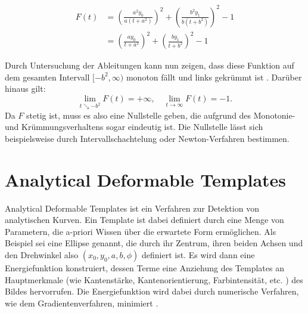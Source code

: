 \begin{enumerate}
\[
	\begin{aligned}
		F(t) &= \left(\frac{a^2y_0}{a\left(t+a^2\right)}\right)^2 + \left(\frac{b^2y_1}{b\left(t+b^2\right)}\right)^2 - 1 \\
		&= \left(\frac{ay_0}{t+a^2}\right)^2 + \left(\frac{by_1}{t+b^2}\right)^2 - 1
	\end{aligned}
\]

	Durch Untersuchung der Ableitungen kann nun zeigen, dass diese Funktion auf dem gesamten Intervall $[-b^2,\infty)$ monoton fällt und links gekrümmt ist \cite{Eberly2013}. Darüber hinaus gilt:
	\[
	\lim\limits_{t \searrow -b^2}{F(t)}	= +\infty, \quad\lim\limits_{t \rightarrow \infty}{F(t)}	= -1.
	\]
	Da $F$ stetig ist, muss es also eine Nullstelle geben, die aufgrund des Monotonie- und Krümmungsverhaltens sogar eindeutig ist. Die Nullstelle lässt sich beispielsweise durch Intervallschachtelung oder Newton-Verfahren bestimmen.
\end{enumerate}


\section{Analytical Deformable Templates}
\label{s:anaDef}
Analytical Deformable Templates ist ein Verfahren zur Detektion von analytischen Kurven.
Ein Template ist dabei definiert durch eine Menge von Parametern, die a-priori Wissen über die erwartete Form ermöglichen.
Als Beispiel sei eine  Ellipse genannt, die durch ihr Zentrum, ihren beiden Achsen und den Drehwinkel also $(x_0,y_0,a,b,\phi)$ definiert ist.
Es wird dann eine Energiefunktion konstruiert, dessen Terme eine Anziehung des Templates an Hauptmerkmale (wie Kantenstärke, Kantenorientierung, Farbintensität, etc. ) des Bildes hervorrufen.
Die Energiefunktion wird dabei durch numerische Verfahren, wie dem Gradientenverfahren, minimiert \cite{Yuille1992}.
